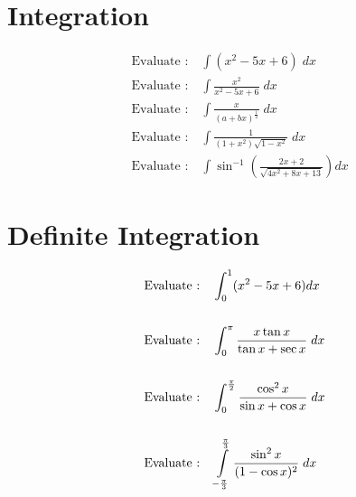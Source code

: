 \documentclass[17pt]{extarticle}
\begin{document}
\section{Integration}

\begin{align}
& \text{Evaluate :} \quad \int  (x^2 - 5x + 6)\;dx\\
& \text{Evaluate :}\quad \int  \frac{x^2}{x^2-5x + 6}\;dx  \\
& \text{Evaluate :}\quad \int  \frac{x}{(a+bx)^{\frac{1}{2}}} \;dx  \\
& \text{Evaluate :}\quad \int  \frac{1}{(1+x^2)\sqrt{1-x^2}}\;dx\\
& \text{Evaluate :}\quad \int  \sin^{-1}\left(\frac{2x+2}{\sqrt{4x^2+8x+13}}\right)dx
\end{align}

\section{Definite Integration}

\begin{align*}
& \text{Evaluate :} \quad \int_0^1  (x^2 - 5x + 6) dx\\ \\
& \text{Evaluate :}\quad \int_0^\pi  \frac{x\tan x}{\tan x + \sec x}\;dx  \\ \\
& \text{Evaluate :}\quad \int_0^{\frac{\pi}{2}} \frac{\cos^2x}{\sin x + \cos x} \;dx  \\ \\
& \text{Evaluate :}\quad \int\displaylimits_{-\frac{\pi}{3}}^{\frac{\pi}{3}} \frac{\sin^2x}{(1 -\cos x)^2}\;dx\\
\end{align*}
\end{document}
